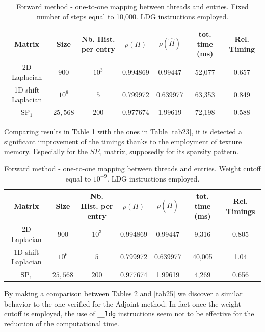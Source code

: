 \documentclass[a4paper,10pt]{article}
\begin{document}
\begin{table}[!h]
\hspace*{-1cm}
\begin{tabular}{|c|c|c|c|c|c|c|}
\hline
\textbf{Matrix} & \textbf{Size} &\textbf{Nb. Hist. per entry} & $\rho(H)$ 
& $\rho(\hat{H})$ & tot. time (ms)& Rel. Timing\\
\hline
2D Laplacian& $900$ & $10^3$ & 0.994869 & 0.99447 & 52,077 & 0.657\\
\hline 
1D shift Laplacian& $10^6$ & $5$ & 0.799972 & 0.639977 & 63,353 & 0.849\\
\hline
$\text{SP}_1$ & $25,568$ & $200$ & 0.977674 & 1.99619 & 72,198 & 0.588\\
\hline
\end{tabular}
\caption{Forward method - one-to-one mapping between threads and entries. Fixed 
number of steps equal to 10,000. LDG instructions employed.}
\label{tab26}
\end{table}

Comparing results in Table \ref{tab26} with the ones in Table \ref{tab23}, it 
is detected a significant improvement of the timings thanks to the employment 
of texture memory. Especially for the $SP_1$ matrix, supposedly for its 
sparsity pattern.


\begin{table}[!h]
\hspace*{-1cm}
\begin{tabular}{|c|c|c|c|c|c|c|}
\hline
\textbf{Matrix} & \textbf{Size} &\textbf{Nb. Hist. per entry} & $\rho(H)$ 
& $\rho(\hat{H})$ & tot. time (ms) & Rel. Timings\\
\hline
2D Laplacian& $900$ & $10^3$ & 0.994869 & 0.99447 & 9,316 & 0.805\\
\hline 
1D shift Laplacian& $10^6$ & $5$ & 0.799972 & 0.639977 & 40,005 & 1.04\\
\hline
$\text{SP}_1$ & $25,568$ & $200$ & 0.977674 & 1.99619 & 4,269 & 0.656\\
\hline
\end{tabular}
\caption{Forward method - one-to-one mapping between threads and entries. 
Weight cutoff equal to $10^{-9}$. LDG instructions employed.}
\label{tab27}
\end{table}

By making a comparison between Tables \ref{tab27} and \ref{tab25} we discover a 
similar behavior to the one verified for the Adjoint method. In fact once the 
weight cutoff is employed, the use of \texttt{\_\_ldg} instructions seem not to 
be effective for the reduction of the computational time.
\end{document}
